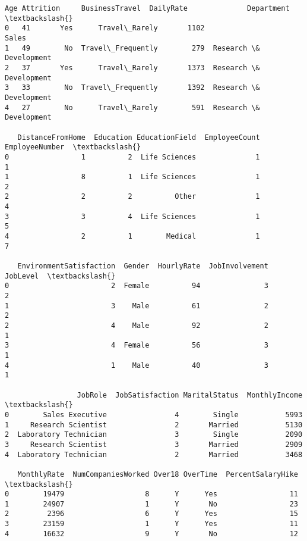 \documentclass[11pt]{article}
\makeatletter
\newcommand{\boxspacing}{\kern\kvtcb@left@rule\kern\kvtcb@boxsep}
\newcommand{\prompt}[4]{
        {\ttfamily\llap{{\color{#2}[#3]:\hspace{3pt}#4}}\vspace{-\baselineskip}}
    }
\makeatother
\begin{document}
            \begin{tcolorbox}[breakable, size=fbox, boxrule=.5pt, pad at break*=1mm, opacityfill=0]
\prompt{Out}{outcolor}{55}{\boxspacing}
\begin{Verbatim}[commandchars=\\\{\}]
   Age Attrition     BusinessTravel  DailyRate              Department  \textbackslash{}
0   41       Yes      Travel\_Rarely       1102                   Sales
1   49        No  Travel\_Frequently        279  Research \& Development
2   37       Yes      Travel\_Rarely       1373  Research \& Development
3   33        No  Travel\_Frequently       1392  Research \& Development
4   27        No      Travel\_Rarely        591  Research \& Development

   DistanceFromHome  Education EducationField  EmployeeCount  EmployeeNumber  \textbackslash{}
0                 1          2  Life Sciences              1               1
1                 8          1  Life Sciences              1               2
2                 2          2          Other              1               4
3                 3          4  Life Sciences              1               5
4                 2          1        Medical              1               7

   EnvironmentSatisfaction  Gender  HourlyRate  JobInvolvement  JobLevel  \textbackslash{}
0                        2  Female          94               3         2
1                        3    Male          61               2         2
2                        4    Male          92               2         1
3                        4  Female          56               3         1
4                        1    Male          40               3         1

                 JobRole  JobSatisfaction MaritalStatus  MonthlyIncome  \textbackslash{}
0        Sales Executive                4        Single           5993
1     Research Scientist                2       Married           5130
2  Laboratory Technician                3        Single           2090
3     Research Scientist                3       Married           2909
4  Laboratory Technician                2       Married           3468

   MonthlyRate  NumCompaniesWorked Over18 OverTime  PercentSalaryHike  \textbackslash{}
0        19479                   8      Y      Yes                 11
1        24907                   1      Y       No                 23
2         2396                   6      Y      Yes                 15
3        23159                   1      Y      Yes                 11
4        16632                   9      Y       No                 12


\end{Verbatim}
\end{tcolorbox}
\end{document}
